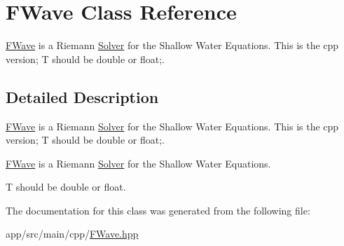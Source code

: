 \hypertarget{classFWave}{}\section{F\+Wave Class Reference}
\label{classFWave}


\hyperlink{classFWave}{F\+Wave} is a Riemann \hyperlink{namespaceSolver}{Solver} for the Shallow Water Equations. This is the cpp version; T should be double or float;.  




\subsection{Detailed Description}
\hyperlink{classFWave}{F\+Wave} is a Riemann \hyperlink{namespaceSolver}{Solver} for the Shallow Water Equations. This is the cpp version; T should be double or float;. 

\hyperlink{classFWave}{F\+Wave} is a Riemann \hyperlink{namespaceSolver}{Solver} for the Shallow Water Equations.

T should be double or float. 

The documentation for this class was generated from the following file\+:\begin{DoxyCompactItemize}
\item 
app/src/main/cpp/\hyperlink{FWave_8hpp}{F\+Wave.\+hpp}\end{DoxyCompactItemize}
